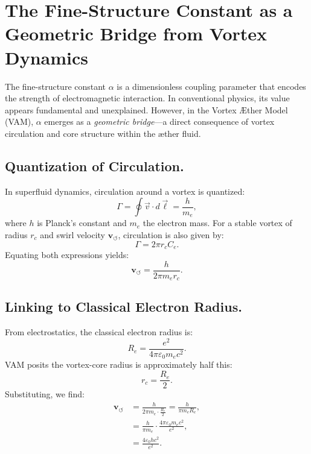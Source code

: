 \section{The Fine-Structure Constant as a Geometric Bridge from Vortex Dynamics}
\label{sec:alpha-geometric-bridge}

The fine-structure constant \( \alpha \) is a dimensionless coupling parameter that encodes the strength of electromagnetic interaction. In conventional physics, its value appears fundamental and unexplained. However, in the Vortex Æther Model (VAM), \( \alpha \) emerges as a \emph{geometric bridge}—a direct consequence of vortex circulation and core structure within the æther fluid.

\subsection{Quantization of Circulation.}
In superfluid dynamics, circulation around a vortex is quantized:
\begin{equation*}
    \Gamma = \oint \vec{v} \cdot d\vec{\ell} = \frac{h}{m_e},
\end{equation*}
where \( h \) is Planck's constant and \( m_e \) the electron mass. For a stable vortex of radius \( r_c \) and swirl velocity \( \mathbf{v}_{\scriptscriptstyle\boldsymbol{\circlearrowleft}} \), circulation is also given by:
\begin{equation*}
    \Gamma = 2 \pi r_c C_e.
\end{equation*}
Equating both expressions yields:
\begin{equation}
    \mathbf{v}_{\scriptscriptstyle\boldsymbol{\circlearrowleft}} = \frac{h}{2\pi m_e r_c}.
\end{equation}

\subsection{Linking to Classical Electron Radius.}
From electrostatics, the classical electron radius is:
\begin{equation*}
    R_e = \frac{e^2}{4\pi \varepsilon_0 m_e c^2}.
\end{equation*}
VAM posits the vortex-core radius is approximately half this:
\begin{equation*}
    r_c = \frac{R_e}{2}.
\end{equation*}
Substituting, we find:
\begin{align}
    \mathbf{v}_{\scriptscriptstyle\boldsymbol{\circlearrowleft}} &= \frac{h}{2\pi m_e \cdot \frac{R_e}{2}} = \frac{h}{\pi m_e R_e}, \\
    &= \frac{h}{\pi m_e} \cdot \frac{4\pi \varepsilon_0 m_e c^2}{e^2}, \\
    &= \frac{4 \varepsilon_0 h c^2}{e^2}.
\end{align}

